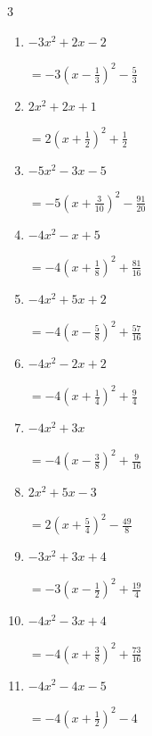 \begin{multicols}{3}
\begin{enumerate}
\columnbreak %

  \item $-3x^{2}+2x-2$

        $\displaystyle =-3\left( x-\frac{1}{3}\right)^{2}-\frac{5}{3}$

  \item $2x^{2}+2x+1$

        $\displaystyle =2\left( x+\frac{1}{2}\right)^{2}+\frac{1}{2}$

  \item $-5x^{2}-3x-5$

        $\displaystyle =-5\left( x+\frac{3}{10}\right)^{2}-\frac{91}{20}$

  \item $-4x^{2}-x+5$

        $\displaystyle =-4\left( x+\frac{1}{8}\right)^{2}+\frac{81}{16}$

  \item $-4x^{2}+5x+2$

        $\displaystyle =-4\left( x-\frac{5}{8}\right)^{2}+\frac{57}{16}$

\columnbreak %

  \item $-4x^{2}-2x+2$

        $\displaystyle =-4\left( x+\frac{1}{4}\right)^{2}+\frac{9}{4}$

  \item $-4x^{2}+3x$

        $\displaystyle =-4\left( x-\frac{3}{8}\right)^{2}+\frac{9}{16}$

  \item $2x^{2}+5x-3$

        $\displaystyle =2\left( x+\frac{5}{4}\right)^{2}-\frac{49}{8}$

  \item $-3x^{2}+3x+4$

        $\displaystyle =-3\left( x-\frac{1}{2}\right)^{2}+\frac{19}{4}$

  \item $-4x^{2}-3x+4$

        $\displaystyle =-4\left( x+\frac{3}{8}\right)^{2}+\frac{73}{16}$

\columnbreak %

\resetques

  \item $-4x^{2}-4x-5$

        $\displaystyle =-4\left( x+\frac{1}{2}\right)^{2}-4$


\end{enumerate}
\end{multicols}
